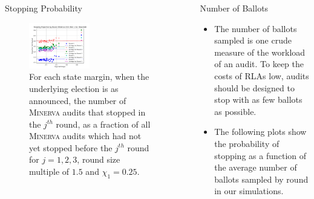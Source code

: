 \documentclass[final]{beamer}
\newcommand{\Minerva}{\textsc{Minerva}\xspace}
\newlength{\sepwidth}
\newlength{\colwidth}
\newcommand{\separatorcolumn}{\begin{column}{\sepwidth}\end{column}}
\begin{document}
\begin{frame}[t]
\begin{columns}[t]
\begin{column}{\colwidth}
\begin{block}{Stopping Probability}
\begin{figure}
\begin{centering}
\includegraphics[width=0.5\textwidth]{minerva25percthen1p5_sprob.png}
\caption{For each state margin, when the underlying election is as announced, the number of \Minerva audits that stopped in the $j^{th}$ round,
as a fraction of all \Minerva audits which had not yet stopped before the $j^{th}$ round for $j=1,2,3$, round size multiple of $1.5$ and $\chi_1 = 0.25$.}
\label{fig:minerva_25}
\end{centering}
\end{figure}

\end{block}

\end{column}

\separatorcolumn

\begin{column}{\colwidth}

\begin{block}{Number of Ballots}

\begin{itemize}
\item
The number of ballots sampled is one crude measure of the workload of an audit.
To keep the costs of RLAs low, audits should be designed to stop with as few ballots as possible.
\item
The following plots show the probability of stopping as a function of the average number of ballots
sampled by round in our simulations.
\end{itemize}


\end{block}
\end{column}
\end{columns}
\end{frame}
\end{document}
